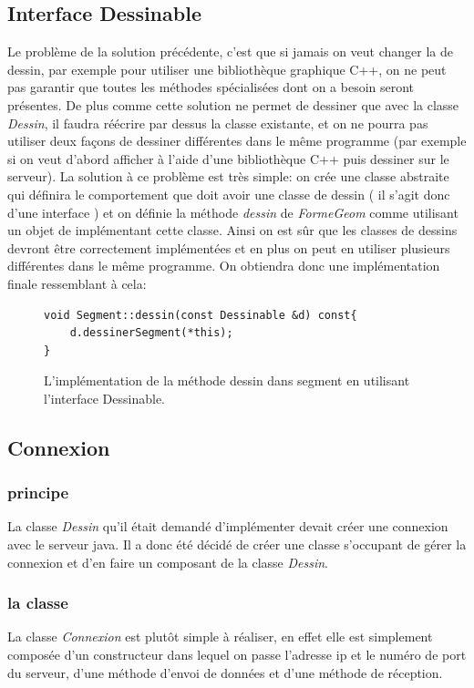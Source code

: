 \documentclass[10pt,a4paper]{report}
\begin{document}
\begin{spacing}{0.8}
\subsection{Interface Dessinable}
Le problème de la solution précédente, c'est que si jamais on veut changer la de dessin, par exemple pour utiliser une bibliothèque graphique C++, on ne peut pas garantir que toutes les méthodes spécialisées dont on a besoin seront présentes. De plus comme cette solution ne permet de dessiner que avec la classe \textit{Dessin}, il faudra réécrire par dessus la classe existante, et on ne pourra pas utiliser deux façons de dessiner différentes dans le même programme (par exemple si on veut d'abord afficher à l'aide d'une bibliothèque C++ puis dessiner sur le serveur). La solution à ce problème est très simple: on crée une classe abstraite qui définira le comportement que doit avoir une classe de dessin ( il s'agit donc d'une interface ) et on définie la méthode \textit{dessin} de \textit{FormeGeom} comme utilisant un objet de implémentant cette classe. Ainsi on est sûr que les classes de dessins devront être correctement implémentées et en plus on peut en utiliser plusieurs différentes dans le même programme.
On obtiendra donc une implémentation finale ressemblant à cela:
\begin{figure}[H]
\begin{verbatim}
void Segment::dessin(const Dessinable &d) const{
    d.dessinerSegment(*this);
}
\end{verbatim}
\caption{L'implémentation de la méthode dessin dans segment en utilisant l'interface Dessinable.}
\end{figure}

\subsection{Connexion}
\subsubsection{principe}
La classe \textit{Dessin} qu'il était demandé d'implémenter devait créer une connexion avec le serveur java. Il a donc été décidé de créer une classe s'occupant de gérer la connexion et d'en faire un composant de la classe \textit{Dessin}.
\subsubsection{la classe}
La classe \textit{Connexion} est plutôt simple à réaliser, en effet elle est simplement composée d'un constructeur dans lequel on passe l'adresse ip et le numéro de port du serveur, d'une méthode d'envoi de données et d'une méthode de réception.

\end{spacing}
\end{document}
